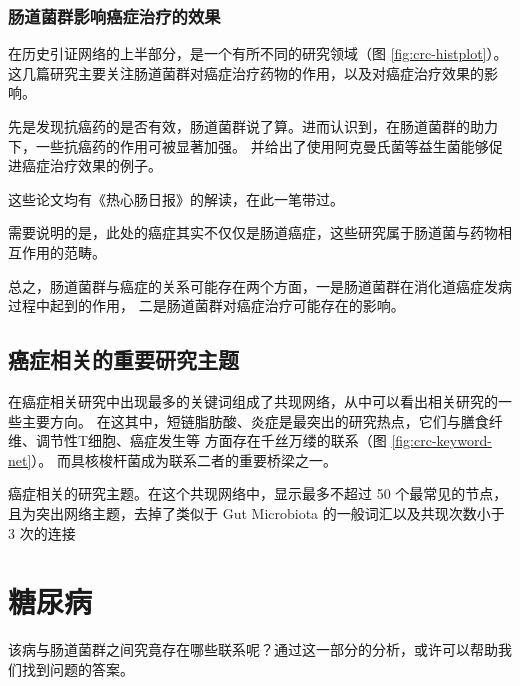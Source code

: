 \documentclass[]{ctexbook}
\begin{document}
\hypertarget{ux80a0ux9053ux83ccux7fa4ux5f71ux54cdux764cux75c7ux6cbbux7597ux7684ux6548ux679c}{%
\subsubsection{肠道菌群影响癌症治疗的效果}\label{ux80a0ux9053ux83ccux7fa4ux5f71ux54cdux764cux75c7ux6cbbux7597ux7684ux6548ux679c}}

在历史引证网络的上半部分，是一个有所不同的研究领域（图 \ref{fig:crc-histplot}）。
这几篇研究主要关注肠道菌群对癌症治疗药物的作用，以及对癌症治疗效果的影响。

先是发现抗癌药的是否有效，肠道菌群说了算。进而认识到，在肠道菌群的助力下，一些抗癌药的作用可被显著加强。
并给出了使用阿克曼氏菌等益生菌能够促进癌症治疗效果的例子。

这些论文均有《热心肠日报》的解读，在此一笔带过。

需要说明的是，此处的癌症其实不仅仅是肠道癌症，这些研究属于肠道菌与药物相互作用的范畴。

总之，肠道菌群与癌症的关系可能存在两个方面，一是肠道菌群在消化道癌症发病过程中起到的作用，
二是肠道菌群对癌症治疗可能存在的影响。

\hypertarget{ux764cux75c7ux76f8ux5173ux7684ux91cdux8981ux7814ux7a76ux4e3bux9898}{%
\subsection{癌症相关的重要研究主题}\label{ux764cux75c7ux76f8ux5173ux7684ux91cdux8981ux7814ux7a76ux4e3bux9898}}

在癌症相关研究中出现最多的关键词组成了共现网络，从中可以看出相关研究的一些主要方向。
在这其中，短链脂肪酸、炎症是最突出的研究热点，它们与膳食纤维、调节性T细胞、癌症发生等
方面存在千丝万缕的联系（图 \ref{fig:crc-keyword-net}）。
而具核梭杆菌成为联系二者的重要桥梁之一。

\hypertarget{htmlwidget-64d023537618aaa9d7ab}{}

\label{fig:crc-keyword-net}癌症相关的研究主题。在这个共现网络中，显示最多不超过 50 个最常见的节点，且为突出网络主题，去掉了类似于 Gut Microbiota 的一般词汇以及共现次数小于 3 次的连接

\hypertarget{diabetes}{%
\section{糖尿病}\label{diabetes}}

该病与肠道菌群之间究竟存在哪些联系呢？通过这一部分的分析，或许可以帮助我们找到问题的答案。
\end{document}
